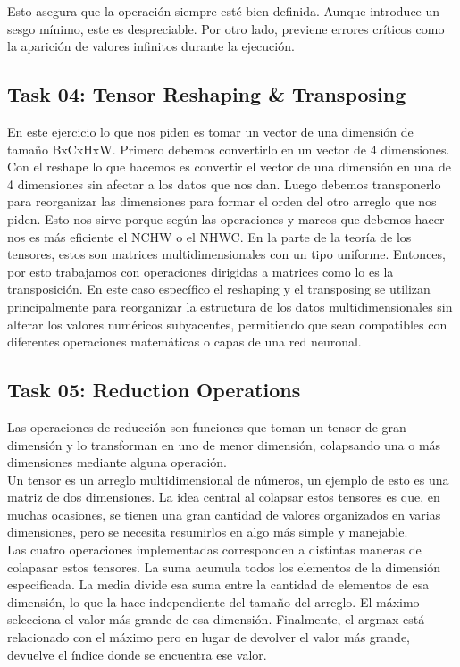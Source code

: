 ﻿\documentclass[12pt]{article}
\begin{document}
Esto asegura que la operación siempre esté bien definida. Aunque introduce un sesgo mínimo, este es despreciable. Por otro lado, previene errores críticos como la aparición de valores infinitos durante la ejecución.


\subsection*{Task 04: Tensor Reshaping \& Transposing}
En este ejercicio lo que nos piden es tomar un vector de una dimensión de tamaño BxCxHxW.
Primero debemos convertirlo en un vector de 4 dimensiones. Con el reshape lo que hacemos es convertir el vector de una dimensión en una de 4 dimensiones sin afectar a los datos que nos dan.
Luego debemos transponerlo para reorganizar las dimensiones para formar el orden del otro arreglo que nos piden.
Esto nos sirve porque según las operaciones y marcos que debemos hacer nos es más eficiente el NCHW o el NHWC.
En la parte de la teoría de los tensores, estos son matrices multidimensionales con un tipo uniforme. Entonces, por esto trabajamos con operaciones dirigidas a matrices como lo es la transposición. En este caso específico el reshaping y el transposing se utilizan principalmente para reorganizar la estructura de los datos multidimensionales sin alterar los valores numéricos subyacentes, permitiendo que sean compatibles con diferentes operaciones matemáticas o capas de una red neuronal. 


\subsection*{Task 05: Reduction Operations}
Las operaciones de reducción son funciones que toman un tensor de gran dimensión
y lo transforman en uno de menor dimensión, colapsando una o más dimensiones mediante alguna operación. \\
Un tensor es un arreglo multidimensional de números, un ejemplo de esto es una matriz de dos dimensiones. 
La idea central al colapsar estos tensores es que, en muchas ocasiones, se tienen una gran cantidad de valores
organizados en varias dimensiones, pero se necesita resumirlos en algo más simple y manejable. \\
Las cuatro operaciones implementadas corresponden a distintas maneras de colapasar estos tensores. La suma acumula
todos los elementos de la dimensión especificada. La media divide esa suma entre la cantidad de elementos de esa dimensión, lo que la hace
independiente del tamaño del arreglo. El máximo selecciona el valor más grande de esa dimensión. Finalmente, el argmax está relacionado
con el máximo pero en lugar de devolver el valor más grande, devuelve el índice donde se encuentra ese valor. \\
\end{document}
